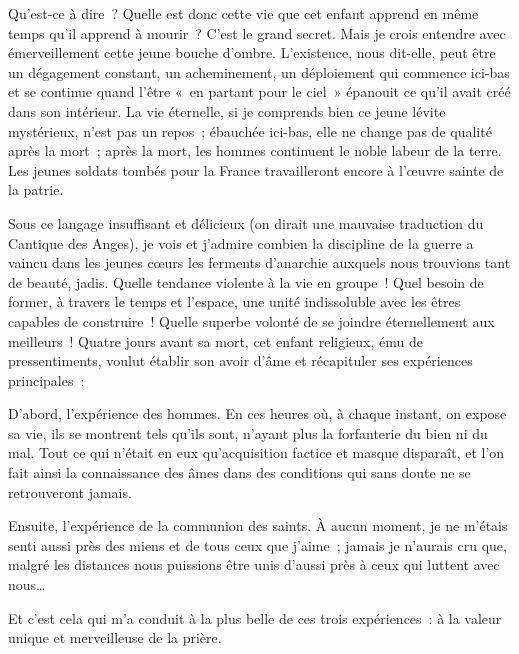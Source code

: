 \documentclass[french,twoside]{book} %
\newenvironment{quoteblock}%
  {\begin{quoting}}
  {\end{quoting}}
\newenvironment{quotebar}{%
    \def\FrameCommand{{\color{rubric!10!}\vrule width 0.5em} \hspace{0.9em}}%
    \def\OuterFrameSep{\itemsep} %
    \MakeFramed {\advance\hsize-\width \FrameRestore}
  }%
  {%
    \endMakeFramed
  }
\renewenvironment{quoteblock}%
  {%
    \savenotes
    \setstretch{0.9}
    \normalfont
    \begin{quotebar}
  }
  {%
    \end{quotebar}
    \spewnotes
  }
\begin{document}
\noindent Qu’est-ce à dire ? Quelle est donc cette vie que cet enfant apprend en même temps qu’il apprend à mourir ? C’est le grand secret. Mais je crois entendre avec émerveillement cette jeune bouche d’ombre. L’existence, nous dit-elle, peut être un dégagement constant, un acheminement, un déploiement qui commence ici-bas et se continue quand l’être « en partant pour le ciel » épanouit ce qu’il avait créé dans son intérieur. La vie éternelle, si je comprends bien ce jeune lévite mystérieux, n’est pas un repos ; ébauchée ici-bas, elle ne change pas de qualité après la mort ; après la mort, les hommes continuent le noble labeur de la terre. Les jeunes soldats tombés pour la France travailleront encore à l’œuvre sainte de la patrie.‌\par
Sous ce langage insuffisant et délicieux (on dirait une mauvaise traduction du Cantique des Anges), je vois et j’admire combien la discipline de la guerre a vaincu dans les jeunes cœurs les ferments d’anarchie auxquels nous trouvions tant de beauté, jadis. Quelle tendance violente à la vie en groupe ! Quel besoin de former, à travers le temps et l’espace, une unité indissoluble avec les êtres capables de construire ! Quelle superbe volonté de se joindre éternellement aux meilleurs ! Quatre jours avant sa mort, cet enfant religieux, ému de pressentiments, voulut établir son avoir d’âme et récapituler ses expériences principales :‌\par

\begin{quoteblock}
 \noindent D’abord, l’expérience des hommes. En ces heures où, à chaque instant, on expose sa vie, ils se montrent tels qu’ils sont, n’ayant plus la forfanterie du bien ni du mal. Tout ce qui n’était en eux qu’acquisition factice et masque disparaît, et l’on fait ainsi la connaissance des âmes dans des conditions qui sans doute ne se retrouveront jamais.‌\par
 Ensuite, l’expérience de la communion des saints. À aucun moment, je ne m’étais senti aussi près des miens et de tous ceux que j’aime ; jamais je n’aurais cru que, malgré les distances nous puissions être unis d’aussi près à ceux qui luttent avec nous…‌\par
 Et c’est cela qui m’a conduit à la plus belle de ces trois expériences : à la valeur unique et merveilleuse de la prière.‌
 \end{quoteblock}
\end{document}

